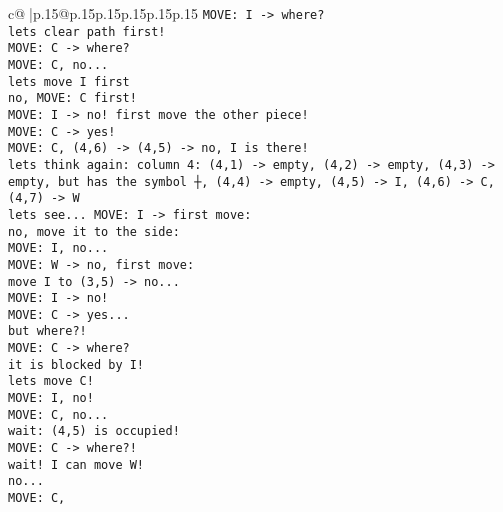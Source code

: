 \documentclass{article}
\begin{document}
{\begin{supertabular}{c@{$\;$}|p{.15\linewidth}@{}p{.15\linewidth}p{.15\linewidth}p{.15\linewidth}p{.15\linewidth}p{.15\linewidth}}
{{{\tt  MOVE: I -> where? \\ \tt  lets clear path first!\\ \tt  MOVE: C -> where? \\ \tt  MOVE: C, no... \\ \tt  lets move I first \\ \tt  no, MOVE: C first!\\ \tt  MOVE: I -> no! first move the other piece!\\ \tt  MOVE: C -> yes!\\ \tt  MOVE: C, (4,6) -> (4,5) -> no, I is there!\\ \tt  lets think again: column 4: (4,1) -> empty, (4,2) -> empty, (4,3) -> empty, but has the symbol ┼, (4,4) -> empty, (4,5) -> I, (4,6) -> C, (4,7) -> W\\ \tt  lets see... MOVE: I -> first move: \\ \tt  no, move it to the side: \\ \tt  MOVE: I, no...\\ \tt  MOVE: W -> no, first move: \\ \tt  move I to (3,5) -> no...\\ \tt  MOVE: I -> no!\\ \tt  MOVE: C -> yes...\\ \tt  but where?!\\ \tt  MOVE: C -> where? \\ \tt  it is blocked by I!\\ \tt  lets move C!\\ \tt  MOVE: I, no!\\ \tt  MOVE: C, no... \\ \tt  wait: (4,5) is occupied!\\ \tt  MOVE: C -> where?!\\ \tt  wait! I can move W!\\ \tt  no...\\ \tt  MOVE: C, }}}
\end{supertabular}}
\end{document}
